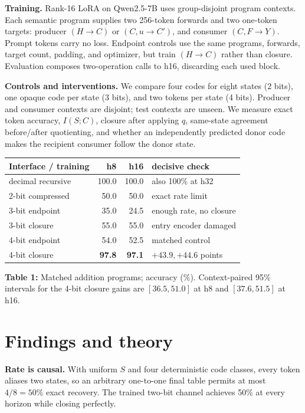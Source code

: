 \documentclass[9pt,twocolumn]{extarticle}
\newcommand{\state}{S}
\newcommand{\code}{C}
\begin{document}
\textbf{Training.}  Rank-16 LoRA on Qwen2.5-7B uses group-disjoint program
contexts.  Each semantic program supplies two 256-token forwards and two
one-token targets: producer $(H\!\to\!\code)$ or
$(\code,u\!\to\!\code')$, and consumer $(\code,F\!\to\!Y)$.  Prompt tokens
carry no loss.  Endpoint controls use the same programs, forwards, target
count, padding, and optimizer, but train $(H\!\to\!\code)$ rather than closure.
Evaluation composes two-operation calls to h16, discarding each used block.

\textbf{Controls and interventions.}  We compare four codes for eight states
(2 bits), one opaque code per state (3 bits), and two tokens per state (4
bits).  Producer and consumer contexts are disjoint; test contexts are unseen.
We measure exact token accuracy, $I(\state;\code)$, closure after applying $q$,
same-state agreement before/after quotienting, and whether an independently
predicted donor code makes the recipient consumer follow the donor state.

\begin{center}
\centering
\scriptsize
\setlength{\tabcolsep}{2.5pt}
\begin{tabular}{@{}lrrl@{}}
\toprule
Interface / training & h8 & h16 & decisive check\\
\midrule
decimal recursive & 100.0 & 100.0 & also 100\% at h32\\
2-bit compressed & 50.0 & 50.0 & exact rate limit\\
3-bit endpoint & 35.0 & 24.5 & enough rate, no closure\\
3-bit closure & 55.0 & 55.0 & entry encoder damaged\\
4-bit endpoint & 54.0 & 52.5 & matched control\\
4-bit closure & \textbf{97.8} & \textbf{97.1} & $+43.9,+44.6$ points\\
\bottomrule
\end{tabular}
\par\vspace{0.15em}
\parbox{0.98\columnwidth}{\scriptsize\textbf{Table 1:}
Matched addition programs; accuracy (\%).  Context-paired
95\% intervals for the 4-bit closure gains are $[36.5,51.0]$ at h8 and
$[37.6,51.5]$ at h16.}
\end{center}

\section*{\fontsize{9}{10}\selectfont Findings and theory}
\vspace{-0.3em}
\textbf{Rate is causal.}  With uniform $\state$ and four deterministic code
classes, every token aliases two states, so an arbitrary one-to-one final table
permits at most $4/8=50\%$ exact recovery.  The trained two-bit channel achieves
50\% at every horizon while closing perfectly.
\end{document}
